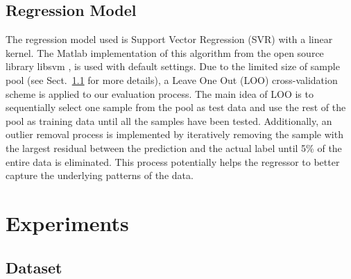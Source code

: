 \documentclass{ws-ijsc}
\begin{document}
\subsection{Regression Model}
The regression model used is Support Vector Regression (SVR) with a linear kernel. The Matlab implementation of this algorithm from the  open source library  libsvm \cite{Chang2011}, is used with default settings. Due to the limited size of sample pool (see Sect.~\ref{subsec:dataset} for more details), a Leave One Out (LOO) cross-validation scheme is applied to our evaluation process. The main idea of LOO is to sequentially select one sample from the pool as test data and use the rest of the pool as training data until all the samples have been tested. Additionally, an outlier removal process is implemented by iteratively removing the sample with the largest residual between the prediction and the actual label until 5\% of the entire data is eliminated. This process potentially helps the regressor to better capture the underlying patterns of the data.  

\section{Experiments}\label{sec:experiments}
\subsection{Dataset}\label{subsec:dataset}
\end{document}

